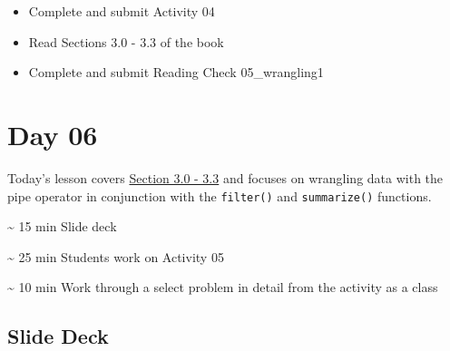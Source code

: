 \documentclass[
  letterpaper,
  DIV=11,
  numbers=noendperiod]{scrreprt}
\begin{document}
\begin{itemize}
\item
  Complete and submit Activity 04
\item
  Read Sections 3.0 - 3.3 of the book
\item
  Complete and submit Reading Check 05\_wrangling1
\end{itemize}


\hypertarget{day-06}{%
\chapter*{Day 06}\label{day-06}}

Today's lesson covers
\href{https://nustat.github.io/intro-stat-data-sci/03-wrangling.html}{Section
3.0 - 3.3} and focuses on wrangling data with the pipe operator in
conjunction with the \texttt{filter()} and \texttt{summarize()}
functions.

\begin{tcolorbox}[enhanced jigsaw, colframe=quarto-callout-note-color-frame, breakable, colback=white, toprule=.15mm, leftrule=.75mm, title={Agenda}, left=2mm, coltitle=black, bottomtitle=1mm, bottomrule=.15mm, rightrule=.15mm, colbacktitle=quarto-callout-note-color!10!white, opacitybacktitle=0.6, opacityback=0, toptitle=1mm, arc=.35mm, titlerule=0mm]
\textasciitilde{} 15 min Slide deck

\textasciitilde{} 25 min Students work on Activity 05

\textasciitilde{} 10 min Work through a select problem in detail from
the activity as a class
\end{tcolorbox}

\hypertarget{slide-deck-5}{%
\section*{Slide Deck}\label{slide-deck-5}}
\end{document}
